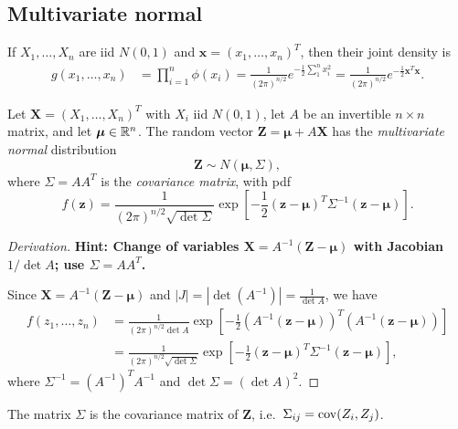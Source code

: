 \documentclass[a4paper]{article}
\begin{document}
\subsection{Multivariate normal}
If $X_1, \dotsc, X_n$ are iid $N(0, 1)$ and $\mathbf{x} = (x_1, \dotsc, x_n)^T$, then their joint density is
\begin{align*}
  g(x_1, \dotsc, x_n) &= \prod_{i = 1}^n \phi(x_i)
  = \frac{1}{(2\pi)^{n/2}} e^{-\frac{1}{2}\sum_1^n x_i^2}
  = \frac{1}{(2\pi)^{n/2}}e^{-\frac{1}{2}\mathbf{x}^T \mathbf{x}}.
\end{align*}

\begin{defi}
  Let $\mathbf{X} = (X_1, \dotsc, X_n)^T$ with $X_i$ iid $N(0,1)$, let $A$ be an invertible $n \times n$ matrix, and let $\boldsymbol\mu \in \mathbb{R}^n$. The random vector $\mathbf{Z} = \boldsymbol\mu + A\mathbf{X}$ has the \emph{multivariate normal} distribution
  \[
    \mathbf{Z} \sim N(\boldsymbol\mu, \Sigma),
  \]
  where $\Sigma = AA^T$ is the \emph{covariance matrix}, with pdf
  \[
    f(\mathbf{z}) = \frac{1}{(2\pi)^{n/2}\sqrt{\det \Sigma}}\exp\left[-\frac{1}{2}(\mathbf{z} - \boldsymbol\mu)^T \Sigma^{-1}(\mathbf{z} - \boldsymbol\mu)\right].
  \]
\end{defi}

\begin{proof}[Derivation]
  \textbf{Hint: Change of variables $\mathbf{X} = A^{-1}(\mathbf{Z} - \boldsymbol\mu)$ with Jacobian $1/\det A$; use $\Sigma = AA^T$.}

  Since $\mathbf{X} = A^{-1}(\mathbf{Z} - \boldsymbol\mu)$ and $|J| = |\det(A^{-1})| = \frac{1}{\det A}$, we have
  \begin{align*}
    f(z_1, \dotsc, z_n) &= \frac{1}{(2\pi)^{n/2}\det A}\exp\left[-\frac{1}{2}(A^{-1}(\mathbf{z} - \boldsymbol\mu))^T(A^{-1}(\mathbf{z} - \boldsymbol\mu))\right]\\
    &= \frac{1}{(2\pi)^{n/2}\sqrt{\det \Sigma}}\exp\left[-\frac{1}{2}(\mathbf{z} - \boldsymbol\mu)^T \Sigma^{-1}(\mathbf{z} - \boldsymbol\mu)\right],
  \end{align*}
  where $\Sigma^{-1} = (A^{-1})^T A^{-1}$ and $\det \Sigma = (\det A)^2$.
\end{proof}

\begin{prop}
  The matrix $\Sigma$ is the covariance matrix of $\mathbf{Z}$, i.e.\ $\Sigma_{ij} = \operatorname{cov}(Z_i, Z_j)$.
\end{prop}
\end{document}
